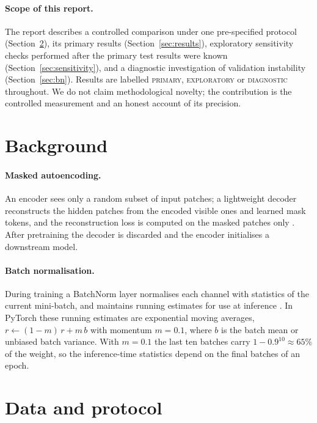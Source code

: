 \documentclass[11pt,a4paper]{article}
\newcommand{\primary}{\textsc{primary}}
\newcommand{\exploratory}{\textsc{exploratory}}
\newcommand{\diagnostic}{\textsc{diagnostic}}
\begin{document}
\paragraph{Scope of this report.} The report describes a controlled comparison under one pre-specified protocol (Section~\ref{sec:protocol}), its primary results (Section~\ref{sec:results}), exploratory sensitivity checks performed after the primary test results were known (Section~\ref{sec:sensitivity}), and a diagnostic investigation of validation instability (Section~\ref{sec:bn}). Results are labelled \primary, \exploratory{} or \diagnostic{} throughout. We do not claim methodological novelty; the contribution is the controlled measurement and an honest account of its precision.

\section{Background}
\paragraph{Masked autoencoding.} An encoder sees only a random subset of input patches; a lightweight decoder reconstructs the hidden patches from the encoded visible ones and learned mask tokens, and the reconstruction loss is computed on the masked patches only \citep{he2022mae}. After pretraining the decoder is discarded and the encoder initialises a downstream model.

\paragraph{Batch normalisation.} During training a BatchNorm layer normalises each channel with statistics of the current mini-batch, and maintains running estimates for use at inference \citep{ioffe2015batchnorm}. In PyTorch these running estimates are exponential moving averages, $r \leftarrow (1-m)\,r + m\,b$ with momentum $m=0.1$, where $b$ is the batch mean or unbiased batch variance. With $m=0.1$ the last ten batches carry $1-0.9^{10}\approx 65\%$ of the weight, so the inference-time statistics depend on the final batches of an epoch.

\section{Data and protocol}\label{sec:protocol}
\end{document}
